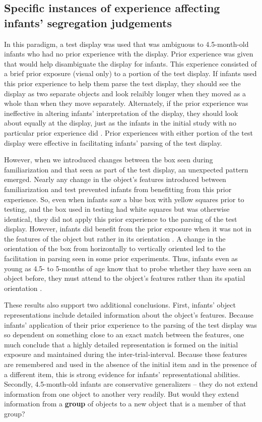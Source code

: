 \subsection{Specific instances of experience affecting infants' segregation judgements}

In this paradigm, a test display was used that was ambiguous to
4.5-month-old infants who had no prior experience with the display.
Prior experience was given that would help disambiguate the display
for infants.  This experience consisted of a brief prior exposure
(visual only) to a portion of the test display.  If infants used this
prior experience to help them parse the test display, they should see
the display as two separate objects and look relaibly longer when they
moved as a whole than when they move separately.  Alternately, if the
prior experience was ineffective in altering infants'
interpretation of the display, they should look about equally at the
display, just as the infants in the initial study with no particular
prior experience did \cite{needham98effects}.  Prior experiences
with either portion of the test display were effective in facilitating
infants' parsing of the test display.  

However, when we introduced changes between the box seen during
familiarization and that seen as part of the test display, an
unexpected pattern emerged.  Nearly any change in the object's
features introduced between familiarization and test prevented infants
from benefitting from this prior experience.  So, even when infants
saw a blue box with yellow squares prior to testing, and the box used
in testing had white squares but was otherwise identical, they did not
apply this prior experience to the parsing of the test display.
However, infants did benefit from the prior exposure when it was not
in the features of the object but rather in its orientation 
 \cite{needham01object}.  
A change in the orientation of the box from horizontally to
vertically oriented led to the facilitation in parsing seen in some
prior experiments.  Thus, infants even as young as 4.5- to 5-months of
age know that to probe whether they have seen an object before, they
must attend to the object's features rather than its spatial
orientation \cite{needham01object}.

These results also support two additional conclusions.  First,
infants' object representations include detailed information
about the object's features.  Because infants'
application of their prior experience to the parsing of the test
display was so dependent on something close to an exact match between
the features, one much conclude that a highly detailed representation
is formed on the initial exposure and maintained during the
inter-trial-interval.  Because these features are remembered and used
in the absence of the initial item and in the presence of a different
item, this is strong evidence for infants' representational
abilities.  Secondly, 4.5-month-old infants are conservative
generalizers -- they do not extend information from one object to
another very readily.  But would they extend information from a {\bf group}
of objects to a new object that is a member of that group?


